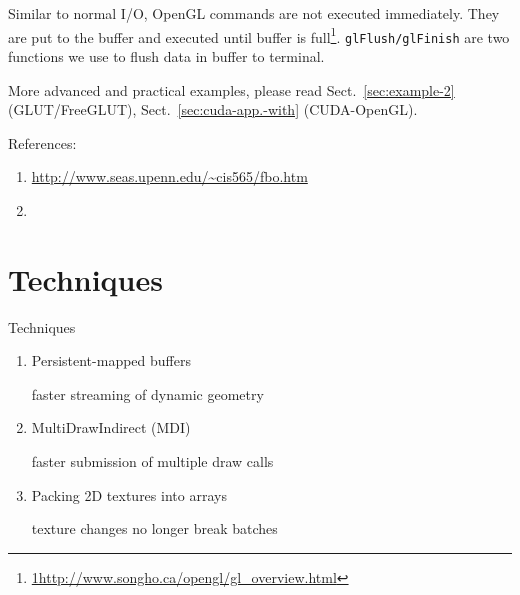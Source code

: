 Similar to normal I/O, OpenGL commands are not executed
immediately. They are put to the buffer and executed until buffer is
full\footnote{\url{1http://www.songho.ca/opengl/gl_overview.html}}.
\verb!glFlush/glFinish! are two functions we use to flush data in
buffer to terminal.

More advanced and practical examples, please read
Sect.~\ref{sec:example-2} (GLUT/FreeGLUT),
Sect.~\ref{sec:cuda-app.-with} (CUDA-OpenGL).


References:
\begin{enumerate}
\item \url{http://www.seas.upenn.edu/~cis565/fbo.htm}
\item 
\end{enumerate}



\section{Techniques}

Techniques
\begin{enumerate}
  \item Persistent-mapped buffers
  
  faster streaming of dynamic geometry
  
  \item MultiDrawIndirect (MDI)
  
  faster submission of multiple draw calls
  
  \item Packing 2D textures into arrays
  
  texture changes no longer break batches
\end{enumerate}

